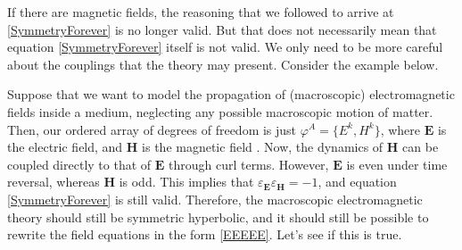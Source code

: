 \documentclass[a4paper, amsfonts, amssymb, amsmath, reprint, showkeys, nofootinbib, twoside, onecolumn,notitlepage]{revtex4-1}
\begin{document}
If there are magnetic fields, the reasoning that we followed to arrive at \eqref{SymmetryForever} is no longer valid. But that does not necessarily mean that equation \eqref{SymmetryForever} itself is not valid. We only need to be more careful about the couplings that the theory may present. Consider the example below.

Suppose that we want to model the propagation of (macroscopic) electromagnetic fields inside a medium, neglecting any possible macroscopic motion of matter. Then, our ordered array of degrees of freedom is just $\varphi^A=\{ E^k,H^k \}$, where $\textbf{E}$ is the electric field, and $\textbf{H}$ is the magnetic field \cite{jackson_classical_1999}. Now, the dynamics of $\textbf{H}$ can be coupled directly to that of $\textbf{E}$ through curl terms. However, $\textbf{E}$ is even under time reversal, whereas $\textbf{H}$ is odd. This implies that $\varepsilon_{\textbf{E}}\varepsilon_{\textbf{H}}=-1$, and equation \eqref{SymmetryForever} is still valid. Therefore, the macroscopic electromagnetic theory should still be symmetric hyperbolic, and it should still be possible to rewrite the field equations in the form \eqref{EEEEE}. Let's see if this is true.
\end{document}
